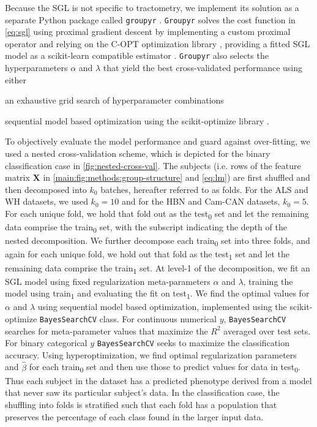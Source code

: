 \documentclass[10pt,%
               aps,%
               prl,%
               preprint,%
               superscriptaddress,%
               preprintnumbers,%
               amsmath,%
               floatfix,%
               endfloats*]{revtex4-2}
\begin{document}
Because the SGL is not specific to tractometry, we implement its solution as
a separate Python package called \texttt{groupyr} \cite{groupyr}.
\texttt{Groupyr} solves the cost function in \cref{eq:sgl} using proximal
gradient descent \cite{parikh2014proximal} by implementing a custom proximal
operator and relying on the C-OPT optimization library \cite{copt}, providing
a fitted SGL model as a scikit-learn compatible estimator \cite{sklearn_api}.
\texttt{Groupyr} also selects the hyperparameters $\alpha$ and $\lambda$ that
yield the best cross-validated performance using either
\begin{enumerate*}[%
    label=(\roman*),%
    before=\unskip{: },%
    itemjoin={{, }},%
    itemjoin*={{, or }}]
    \item an exhaustive grid search of hyperparameter combinations
    \item sequential model based optimization using the scikit-optimize
    library \cite{scikit_optimize}.
\end{enumerate*}

To objectively evaluate the model performance and guard against over-fitting,
we used a nested cross-validation scheme, which is depicted for the binary
classification case in \cref{fig:nested-cross-val}. The subjects (i.e. rows
of the feature matrix $\mathbf{X}$ in \cref{main:fig:methods:group-structure}
and \cref{eq:lm}) are first shuffled and then decomposed into $k_0$ batches,
hereafter referred to as folds. For the ALS and WH datasets, we used $k_0 =
10$ and for the HBN and Cam-CAN datasets, $k_0 = 5$. For each unique fold, we
hold that fold out as the test\textsubscript{0} set and let the remaining
data comprise the train\textsubscript{0} set, with the subscript indicating
the depth of the nested decomposition. We further decompose each
train\textsubscript{0} set into three folds, and again for each unique fold,
we hold out that fold as the test\textsubscript{1} set and let the remaining
data comprise the train\textsubscript{1} set. At level-1 of the
decomposition, we fit an SGL model using fixed regularization meta-parameters
$\alpha$ and $\lambda$, training the model using train\textsubscript{1} and
evaluating the fit on test\textsubscript{1}. We find the optimal values for
$\alpha$ and $\lambda$ using sequential model based optimization, implemented
using the scikit-optimize \verb|BayesSearchCV| class\cite{scikit-optimize}.
For continuous numerical $y$, \verb|BayesSearchCV| searches for
meta-parameter values that maximize the $R^2$ averaged over test sets. For
binary categorical $y$ \verb|BayesSearchCV| seeks to maximize the
classification accuracy. Using hyperoptimization, we find optimal
regularization parameters and $\hat{\beta}$ for each train\textsubscript{0}
set and then use those to predict values for data in test\textsubscript{0}.
Thus each subject in the dataset has a predicted phenotype derived from a
model that never saw its particular subject's data. In the classification
case, the shuffling into folds is stratified such that each fold has a
population that preserves the percentage of each class found in the larger
input data.
\end{document}

